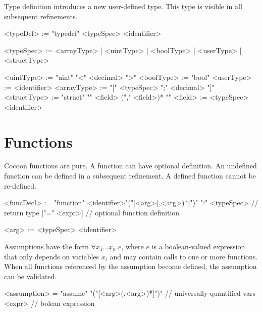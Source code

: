 \documentclass{report}
\begin{document}
Type definition introduces a new user-defined type.  This type is visible in all
subsequent refinements.

\begin{bnflisting}{}
<typeDef> := "typedef" <typeSpec> <identifier>
\end{bnflisting}

\begin{bnflisting}{}
<typeSpec> := <arrayType>
            | <uintType>
            | <boolType>
            | <userType>
            | <structType>
\end{bnflisting}

\begin{bnflisting}{}
<uintType>   := "uint" "<" <decimal> ">"
<boolType>   := "bool"
<userType>   := <identifier>
<arrayType>  := "[" <typeSpec> ";" <decimal> "]"
<structType> := "struct" "{" 
                 <field> ("," <field>)*
                "}"
<field> := <typeSpec> <identifier>
\end{bnflisting}

\section{Functions}

Cocoon functions are pure.  A function can have optional definition.
An undefined function can be defined in a subsequent refinement.  A
defined function cannot be re-defined.

\begin{bnflisting}{}
<funcDecl> := "function" <identifier>"("[<arg>(,<arg>)*]")"
              ":" <typeSpec> // return type
              ["=" <expr>]   // optional function definition
\end{bnflisting}

\begin{bnflisting}{}
<arg> := <typeSpec> <identifier>
\end{bnflisting}

Assumptions have the form $\forall x_1\ldots x_n . e$, 
where $e$ is a boolean-valued expression that only depends on variables $x_i$ and
may contain calls to one or more functions.
When all functions referenced by the assumption become defined, the assumption can be
validated.

\begin{bnflisting}{}
<assumption> = "assume" 
           "("[<arg>(,<arg>)*]")" // universally-quantified vars
           <expr>                 // bolean expression
\end{bnflisting}
\end{document}
